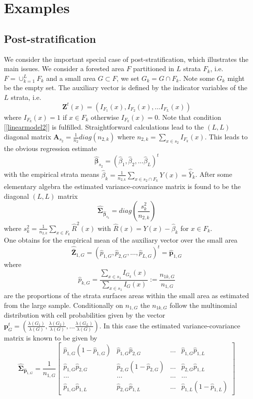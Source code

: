 \documentclass[a4paper,12pt,leqno, titlepage]{article}
\begin{document}
\section{Examples}
\subsection{Post-stratification}\label{poststrat}
We consider the important special case of post-stratification, which illustrates the main issues. We consider a forested area $F$ partitioned in $L$ strata $F_k$, i.e. $F=\cup_{k=1}^L F_k$ and a small area $G\subset F$, we set $G_k=G \cap F_k$. Note some $G_k$ might be the empty set. The auxiliary vector is defined by the indicator variables of the $L$ strata, i.e.
$$\pmb{Z}^t(x)=(I_{F_1}(x),I_{F_2}(x),\ldots I_{F_L}(x))$$
 where $I_{F_k}(x)=1$ if $x\in{F}_k$ otherwise $I_{F_k}(x)=0$. Note that condition [\ref{linearmodel2}] is fulfilled. Straightforward calculations lead to the $(L,L)$ diagonal matrix $\pmb{A}_{s_2}=\frac{1}{n_2}diag(n_{2,k})$ where $n_{2,k}=\sum_{x\in{s_2}}I_{F_k}(x)$. This leads to the obvious regression estimate
 $$\hat{\pmb{\beta}}_{s_2}=(\hat{\beta}_1,\hat{\beta}_2,\ldots \hat{\beta}_L)^t$$
 with the empirical strata means $\hat{\beta}_k=\frac{1}{n_{2,k}}\sum_{x\in{s_2}\cap F_k}Y(x)=\hat{\bar{Y}}_k$.
 After some elementary algebra the estimated variance-covariance matrix is found to be the diagonal $(L,L)$ matrix
 $$\hat{\pmb{\Sigma}}_{\hat{\pmb{\beta}}_{s_2}}=diag(\frac{s_k^2}{n_{2,k}})$$
 where
 $s_k^2=\frac{1}{n_{2,k}}\sum_{x\in{F_k}}\hat{R}^2(x)$ with $\hat{R}(x)=Y(x)-\hat{\beta}_k$ for $x\in{F}_k$.\\
 One obtains for the empirical mean of the auxiliary vector over the small area
 $$\hat{\bar{\pmb{Z}}}_{1,G}=(\hat{p}_{1,G},\hat{p}_{2,G},\ldots, \hat{p}_{L,G})^t=\hat{\pmb{p}}_{1,G}$$
 where
 $$\hat{p}_{k,G}=\frac{\sum_{x\in{s_1}}I_{G_k}(x)}{\sum_{x\in{s_1}}I_G(x)}:=\frac{n_{1k,G}}{n_{1,G}}$$
 \noindent are the proportions of the strata surfaces areas within the small area as estimated from the large sample. Conditionally on $n_{1,G}$ the $n_{1k,G}$ follow the multinomial distribution with cell probabilities given by the vector
 $\pmb{p}^t_{G}=(\frac{\lambda(G_1)}{\lambda(G)},\frac{\lambda(G_2)}{\lambda(G)},\ldots \frac{\lambda(G_L)}{\lambda(G)})$. In this case the estimated variance-covariance matrix is known to be given by
 \begin{equation}\label{covmatrixcellfreq}
 \hat{\pmb{\Sigma}}_{\hat{\pmb{p}}_{1,G}}=
\frac{1}{n_{1,G}}\left[ \begin {array}{cccc}
\hat{p}_{1,G}(1-\hat{p}_{1,G})& \hat{p}_{1,G}\hat{p}_{2,G} &\ldots& \hat{p}_{1,G}\hat{p}_{1,L}\\
\hat{p}_{1,G}\hat{p}_{2,G}& \hat{p}_{2,G}(1-\hat{p}_{2,G}) &\ldots& \hat{p}_{2,G}\hat{p}_{1,L}\\
\ldots & \ldots & \ldots & \ldots \\
\hat{p}_{1,G}\hat{p}_{1,L} & \hat{p}_{2,G}\hat{p}_{1,L}& \ldots & \hat{p}_{1,L}(1-\hat{p}_{1,L}) \end {array} \right]
\end{equation}
\end{document}

